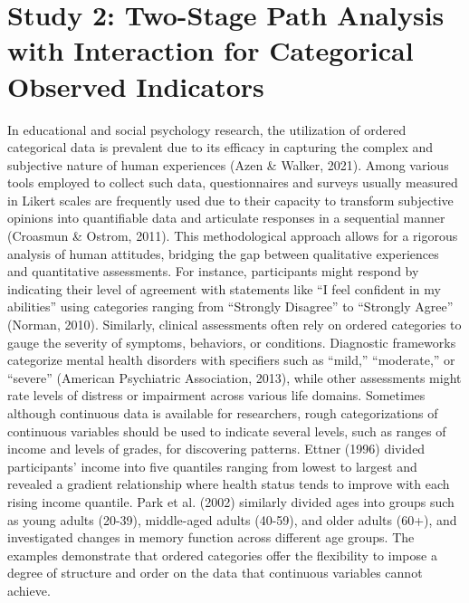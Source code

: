 \documentclass[
  11pt,
  man]{apa6}
\begin{document}
\newpage

\hypertarget{study-2-two-stage-path-analysis-with-interaction-for-categorical-observed-indicators}{%
\section{Study 2: Two-Stage Path Analysis with Interaction for Categorical Observed Indicators}\label{study-2-two-stage-path-analysis-with-interaction-for-categorical-observed-indicators}}

In educational and social psychology research, the utilization of ordered categorical data is prevalent due to its efficacy in capturing the complex and subjective nature of human experiences (Azen \& Walker, 2021). Among various tools employed to collect such data, questionnaires and surveys usually measured in Likert scales are frequently used due to their capacity to transform subjective opinions into quantifiable data and articulate responses in a sequential manner (Croasmun \& Ostrom, 2011). This methodological approach allows for a rigorous analysis of human attitudes, bridging the gap between qualitative experiences and quantitative assessments. For instance, participants might respond by indicating their level of agreement with statements like ``I feel confident in my abilities'' using categories ranging from ``Strongly Disagree'' to ``Strongly Agree'' (Norman, 2010). Similarly, clinical assessments often rely on ordered categories to gauge the severity of symptoms, behaviors, or conditions. Diagnostic frameworks categorize mental health disorders with specifiers such as ``mild,'' ``moderate,'' or ``severe'' (American Psychiatric Association, 2013), while other assessments might rate levels of distress or impairment across various life domains. Sometimes although continuous data is available for researchers, rough categorizations of continuous variables should be used to indicate several levels, such as ranges of income and levels of grades, for discovering patterns. Ettner (1996) divided participants' income into five quantiles ranging from lowest to largest and revealed a gradient relationship where health status tends to improve with each rising income quantile. Park et al. (2002) similarly divided ages into groups such as young adults (20-39), middle-aged adults (40-59), and older adults (60+), and investigated changes in memory function across different age groups. The examples demonstrate that ordered categories offer the flexibility to impose a degree of structure and order on the data that continuous variables cannot achieve.
\end{document}
